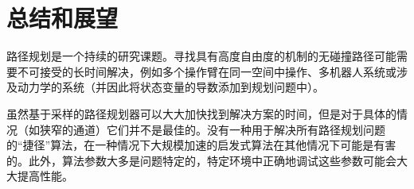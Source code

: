  
\section{总结和展望}
路径规划是一个持续的研究课题。寻找具有高度自由度的机制的无碰撞路径可能需要不可接受的长时间解决，例如多个操作臂在同一空间中操作、多机器人系统或涉及动力学的系统（并因此将状态变量的导数添加到规划问题中）。


虽然基于采样的路径规划器可以大大加快找到解决方案的时间，但是对于具体的情况（如狭窄的通道）它们并不是最佳的。没有一种用于解决所有路径规划问题的“捷径”算法，在一种情况下大规模加速的启发式算法在其他情况下可能是有害的。此外，算法参数大多是问题特定的，特定环境中正确地调试这些参数可能会大大提高性能。


